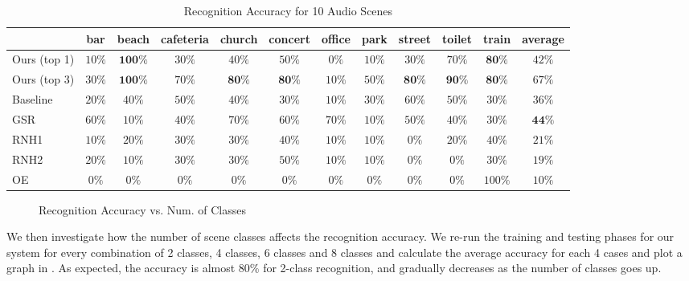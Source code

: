 \begin{table*}[th]
\centering
\small
\caption{Recognition Accuracy for 10 Audio Scenes}
\label{tab:ac}
\begin{tabular}{lccccccccccc}
\hline
 & bar & beach & cafeteria & church & concert & office & park & street & toilet & train & average\\
\hline
Ours (top 1)  & $10\%$ & $\mathbf{100\%}$ & $30\%$ & $40\%$ & $50\%$ & $0\%$ & $10\%$ & $30\%$ & $70\%$ & $\mathbf{80\%}$ & $42\%$\\
Ours (top 3)  & $30\%$ & $\mathbf{100\%}$ & $70\%$ & $\mathbf{80\%}$ & $\mathbf{80\%}$ & $10\%$ & $50\%$ & $\mathbf{80\%}$ & $\mathbf{90\%}$ & $\mathbf{80\%}$ & $67\%$ \\
\hline Baseline  & $20\%$ & $40\%$ & $50\%$ & $40\%$ & $30\%$ & $10\%$ & $30\%$ & $60\%$ & $50\%$ & $30\%$ & $36\%$\\
\hline GSR & $60\%$ & $10\%$ & $40\%$ & $70\%$ & $60\%$ & $70\%$ & $10\%$ & $50\%$ & $40\%$ & $30\%$ & $\mathbf{44\%}$\\
\hline RNH1 & $10\%$ & $20\%$ & $30\%$ & $30\%$ & $40\%$ & $10\%$ & $10\%$ & $0\%$ & $20\%$ & $40\%$ & $21\%$\\
\hline RNH2 & $20\%$ & $10\%$ & $30\%$ & $30\%$ & $50\%$ & $10\%$ & $10\%$ & $0\%$ & $0\%$ & $30\%$ & $19\%$\\
\hline OE & $0\%$ & $0\%$ & $0\%$ & $0\%$ & $0\%$ & $0\%$ & $0\%$ & $0\%$ & $0\%$ & $100\%$ & $10\%$\\ \hline
\end{tabular}
\end{table*}

\begin{figure}[th]
\centering
{}
\caption{Recognition Accuracy vs. Num. of Classes}
\label{fig:ac}
\end{figure}

We then investigate how the number of scene classes affects the recognition
accuracy. We re-run the training and testing phases for our system for
every combination of 2 classes, 4 classes, 6 classes and 8 classes and
calculate the average accuracy for each 4 cases and plot a graph in .
As expected, the accuracy is almost 80\% for 2-class recognition,
and gradually decreases as the number of classes goes up.

